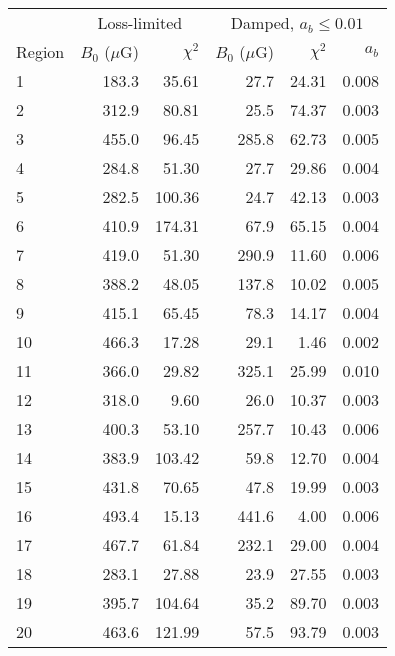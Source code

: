 \begin{tabular}{@{} l rr rrr @{}}
\toprule
{} & \multicolumn{2}{c}{Loss-limited}
   & \multicolumn{3}{c}{Damped, $a_b \leq 0.01$} \\
\cmidrule(lr){2-3} \cmidrule(l){4-6}
Region & $B_0$ ($\mu$G) & $\chi^2$
       & $B_0$ ($\mu$G) & $\chi^2$ & $a_b$ \\
\midrule
1 & 183.3 & 35.61 & 27.7 & 24.31 & 0.008 \\
2 & 312.9 & 80.81 & 25.5 & 74.37 & 0.003 \\
3 & 455.0 & 96.45 & 285.8 & 62.73 & 0.005 \\
\cmidrule{1-6}
4 & 284.8 & 51.30 & 27.7 & 29.86 & 0.004 \\
5 & 282.5 & 100.36 & 24.7 & 42.13 & 0.003 \\
6 & 410.9 & 174.31 & 67.9 & 65.15 & 0.004 \\
7 & 419.0 & 51.30 & 290.9 & 11.60 & 0.006 \\
8 & 388.2 & 48.05 & 137.8 & 10.02 & 0.005 \\
9 & 415.1 & 65.45 & 78.3 & 14.17 & 0.004 \\
10 & 466.3 & 17.28 & 29.1 & 1.46 & 0.002 \\
\cmidrule{1-6}
11 & 366.0 & 29.82 & 325.1 & 25.99 & 0.010 \\
12 & 318.0 & 9.60 & 26.0 & 10.37 & 0.003 \\
13 & 400.3 & 53.10 & 257.7 & 10.43 & 0.006 \\
\cmidrule{1-6}
14 & 383.9 & 103.42 & 59.8 & 12.70 & 0.004 \\
15 & 431.8 & 70.65 & 47.8 & 19.99 & 0.003 \\
16 & 493.4 & 15.13 & 441.6 & 4.00 & 0.006 \\
17 & 467.7 & 61.84 & 232.1 & 29.00 & 0.004 \\
\cmidrule{1-6}
18 & 283.1 & 27.88 & 23.9 & 27.55 & 0.003 \\
19 & 395.7 & 104.64 & 35.2 & 89.70 & 0.003 \\
20 & 463.6 & 121.99 & 57.5 & 93.79 & 0.003 \\
\bottomrule
\end{tabular}


